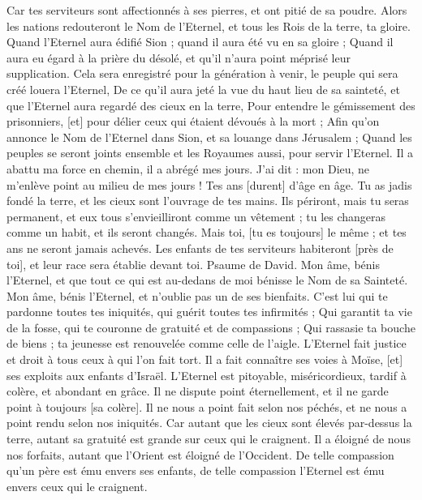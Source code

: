 \begin{multicols}{2}
Car tes serviteurs sont affectionnés à ses pierres, et ont pitié de sa poudre.
Alors les nations redouteront le Nom de l’Eternel, et tous les Rois de la terre, ta gloire.
Quand l'Eternel aura édifié Sion ; quand il aura été vu en sa gloire ;
Quand il aura eu égard à la prière du désolé, et qu'il n'aura point méprisé leur supplication.
Cela sera enregistré pour la génération à venir, le peuple qui sera créé louera l'Eternel,
De ce qu'il aura jeté la vue du haut lieu de sa sainteté, et que l'Eternel aura regardé des cieux en la terre,
Pour entendre le gémissement des prisonniers, [et] pour délier ceux qui étaient dévoués à la mort ;
Afin qu'on annonce le Nom de l’Eternel dans Sion, et sa louange dans Jérusalem ;
Quand les peuples se seront joints ensemble et les Royaumes aussi, pour servir l'Eternel.
Il a abattu ma force en chemin, il a abrégé mes jours.
J'ai dit : mon Dieu, ne m'enlève point au milieu de mes jours ! Tes ans [durent] d'âge en âge.
Tu as jadis fondé la terre, et les cieux sont l'ouvrage de tes mains.
Ils périront, mais tu seras permanent, et eux tous s'envieilliront comme un vêtement ; tu les changeras comme un habit, et ils seront changés.
Mais toi, [tu es toujours] le même ; et tes ans ne seront jamais achevés.
Les enfants de tes serviteurs habiteront [près de toi], et leur race sera établie devant toi.
\VerseOne{}Psaume de David. Mon âme, bénis l'Eternel, et que tout ce qui est au-dedans de moi bénisse le Nom de sa Sainteté.
Mon âme, bénis l'Eternel, et n'oublie pas un de ses bienfaits.
C'est lui qui te pardonne toutes tes iniquités, qui guérit toutes tes infirmités ;
Qui garantit ta vie de la fosse, qui te couronne de gratuité et de compassions ;
Qui rassasie ta bouche de biens ; ta jeunesse est renouvelée comme celle de l'aigle.
L'Eternel fait justice et droit à tous ceux à qui l'on fait tort.
Il a fait connaître ses voies à Moïse, [et] ses exploits aux enfants d'Israël.
L'Eternel est pitoyable, miséricordieux, tardif à colère, et abondant en grâce.
Il ne dispute point éternellement, et il ne garde point à toujours [sa colère].
Il ne nous a point fait selon nos péchés, et ne nous a point rendu selon nos iniquités.
Car autant que les cieux sont élevés par-dessus la terre, autant sa gratuité est grande sur ceux qui le craignent.
Il a éloigné de nous nos forfaits, autant que l'Orient est éloigné de l'Occident.
De telle compassion qu'un père est ému envers ses enfants, de telle compassion l'Eternel est ému envers ceux qui le craignent.

\end{multicols}
